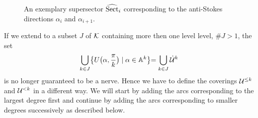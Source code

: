 \begin{figure}[h]
\begin{center}
    \end{center}
    \caption{An exemplary supersector $\widehat{\operatorname{Sect}}_i$ corresponding to the
      anti-Stokes directions $\alpha_i$ and $\alpha_{i+1}$.}
  \end{figure}
If we extend to a subset $J$ of $\mathcal{K}$ containing more then one level level,
$\#J>1$, the set
\[
  \bigcup_{k\in J}\bigl\{U\bigl(\alpha,\frac{\pi}{k}\bigr)\mid\alpha\in\mathbb{A}^{k}\bigl\}
  =\bigcup_{k\in J}\dot{\mathcal{U}}^k
\]
is no longer guaranteed to be a nerve.
Hence we have to define the coverings $\mathcal{U}^{\leq k}$ and $\mathcal{U}^{<k}$ in a
different way. We will start by adding the arcs corresponding to the largest
degree first and continue by adding the arcs corresponding to smaller degrees
successively as described below.

